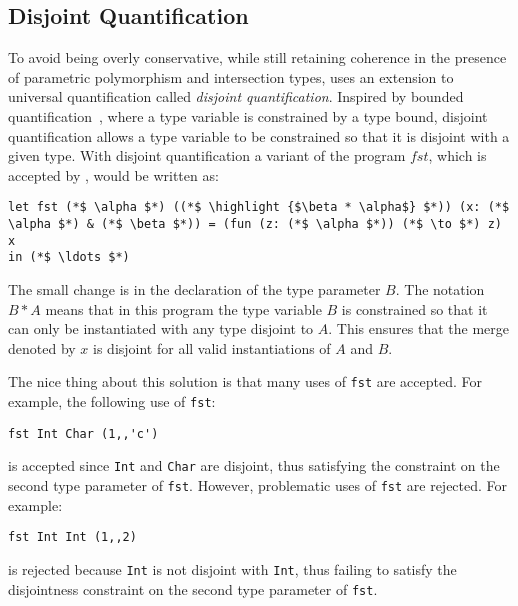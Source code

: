 \subsection{Disjoint Quantification}
To avoid being overly conservative, while still retaining coherence in the
presence of parametric polymorphism and intersection types, \namedis uses
an extension to universal quantification called \emph{disjoint quantification}.
Inspired by
bounded quantification~\cite{Cardelli:1994},
where a type variable is constrained by a type
bound, disjoint quantification allows a type variable to be
constrained so that it is disjoint with a
given type. With disjoint quantification a variant of the program $fst$, which
is accepted by \namedis, would be written as:
\begin{lstlisting}
let fst (*$ \alpha $*) ((*$ \highlight {$\beta * \alpha$} $*)) (x: (*$ \alpha $*) & (*$ \beta $*)) = (fun (z: (*$ \alpha $*)) (*$ \to $*) z) x
in (*$ \ldots $*)
\end{lstlisting}
The small change is in the declaration of the type parameter $B$. The notation
$B*A$ means that in this program the type variable $B$ is constrained so that
it can only be instantiated with any type disjoint to $A$.
This ensures that the
merge denoted by $x$ is disjoint for all valid instantiations of $A$ and $B$.

The nice thing about this solution is that many uses of \lstinline$fst$ are accepted.
For example, the following use of \lstinline$fst$:
\begin{lstlisting}
fst Int Char (1,,'c')
\end{lstlisting}
is accepted since \lstinline$Int$ and \lstinline$Char$ are disjoint, thus satisfying the constraint
on the second type parameter of \lstinline$fst$.
However, problematic uses of \lstinline$fst$ are rejected. For example:
\begin{lstlisting}
fst Int Int (1,,2)
\end{lstlisting}
is rejected because \lstinline$Int$ is not disjoint with \lstinline$Int$, thus failing to satisfy the
disjointness constraint on the second type parameter of \lstinline$fst$.

\begin{comment}
Note that there is a nice symmetry between bounded quantification and disjoint quantification.
In systems with bounded quantification,
the usual unconstrained quantifier $\for {\alpha} \ldots$
is a syntactic sugar for $\for {\alpha \subtype \top} \ldots$, and
$\blam \alpha \ldots$ for $\blam {\alpha \subtype \top} \ldots$.
In parellel, in our system with disjoint quantification,
the usual unconstrained quantifier $\for {\alpha} \ldots$
is a syntactic sugar for $\for {\alpha \disjoint \bot} \ldots$, and
$\blam \alpha \ldots$ for $\blam {\alpha \disjoint \top} \ldots$.
The intuition is that since the bottom type is akin to the empty set,
no other type overlaps with it.\george{Format this paragraph better.}
\end{comment}


